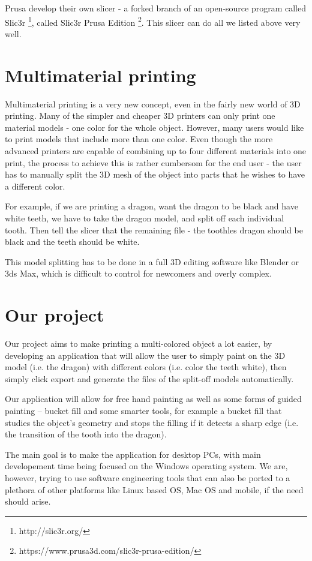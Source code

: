 Prusa develop their own slicer - a forked branch of an open-source program called Slic3r \footnote{http://slic3r.org/}, called Slic3r Prusa Edition \footnote{https://www.prusa3d.com/slic3r-prusa-edition/}. This slicer can do all we listed above very well.

\section{Multimaterial printing}

Multimaterial printing is a very new concept, even in the fairly new world of 3D printing. Many of the simpler and cheaper 3D printers can only print one material models - one color for the whole object. However, many users would like to print models that include more than one color. Even though the more advanced printers are capable of combining up to four different materials into one print, the process to achieve this is rather cumbersom for the end user - the user has to manually split the 3D mesh of the object into parts that he wishes to have a different color.

For example, if we are printing a dragon, want the dragon to be black and have white teeth, we have to take the dragon model, and split off each individual tooth. Then tell the slicer that the remaining file - the toothles dragon should be black and the teeth should be white.

This model splitting has to be done in a full 3D editing software like Blender or 3ds Max, which is difficult to control for newcomers and overly complex.

\section{Our project}

Our project aims to make printing a multi-colored object a lot easier, by developing an application that will allow the user to simply paint on the 3D model (i.e. the dragon) with different colors (i.e. color the teeth white), then simply click export and generate the files of the split-off models automatically.

Our application will allow for free hand painting as well as some forms of guided painting -- bucket fill and some smarter tools, for example a bucket fill that studies the object's geometry and stops the filling if it detects a sharp edge (i.e. the transition of the tooth into the dragon).

The main goal is to make the application for desktop PCs, with main developement time being focused on the Windows operating system. We are, however, trying to use software engineering tools that can also be ported to a plethora of other platforms like Linux based OS, Mac OS and mobile, if the need should arise.

